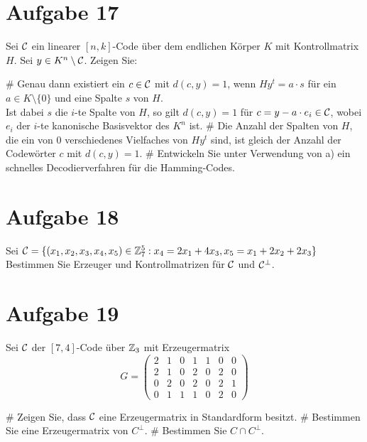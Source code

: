
\setcounter{MaxMatrixCols}{20}

\section*{Aufgabe 17}
Sei $\mathcal{C}$ ein linearer $[n,k]$-Code über dem endlichen Körper $K$ mit Kontrollmatrix $H$.
Sei $y \in K^n \setminus \mathcal{C}$. Zeigen Sie:
\begin{myList}
#
Genau dann existiert ein $c \in \mathcal{C}$ mit $d(c,y)=1$, wenn $Hy^t = a \cdot s$ für ein $a \in K \setminus \lbrace 0 \rbrace$ und eine Spalte $s$ von $H$.\\
Ist dabei $s$ die $i$-te Spalte von $H$, so gilt $d(c,y) = 1$ für $c = y -a\cdot e_i \in \mathcal{C}$, wobei $e_i$ der $i$-te kanonische Basisvektor des $K^n$ ist.
#
Die Anzahl der Spalten von $H$, die ein von 0 verschiedenes Vielfaches von $Hy^t$ sind, ist gleich der Anzahl der Codewörter $c$ mit $d(c,y) = 1$.
#
Entwickeln Sie unter Verwendung von a) ein schnelles Decodierverfahren für die Hamming-Codes.
\end{myList}
\section*{Aufgabe 18}
Sei $\mathcal{C} = \lbrace (x_1,x_2,x_3,x_4,x_5) \in \mathbb{Z}^5_7 : x_4 = 2x_1 + 4x_3, x_5 = x_1 + 2x_2 + 2x_3 \rbrace$
Bestimmen Sie Erzeuger und Kontrollmatrizen für $\mathcal{C}$ und $\mathcal{C}^\bot$.
\section*{Aufgabe 19}
Sei $\mathcal{C}$ der $[7,4]$-Code über $\mathbb{Z}_3$ mit Erzeugermatrix
\begin{equation*}
	G =
	\begin{pmatrix}
	2 & 1 & 0 & 1 & 1 & 0 & 0 \\
	2 & 1 & 0 & 2 & 0 & 2 & 0 \\
	0 & 2 & 0 & 2 & 0 & 2 & 1 \\
	0 & 1 & 1 & 1 & 0 & 2 & 0
	\end{pmatrix}
\end{equation*}
\begin{myList}
#
Zeigen Sie, dass $\mathcal{C}$ eine Erzeugermatrix in Standardform besitzt.
#
Bestimmen Sie eine Erzeugermatrix von $C^\bot$.
#
Bestimmen Sie $C \cap C^\bot$.
\end{myList}
